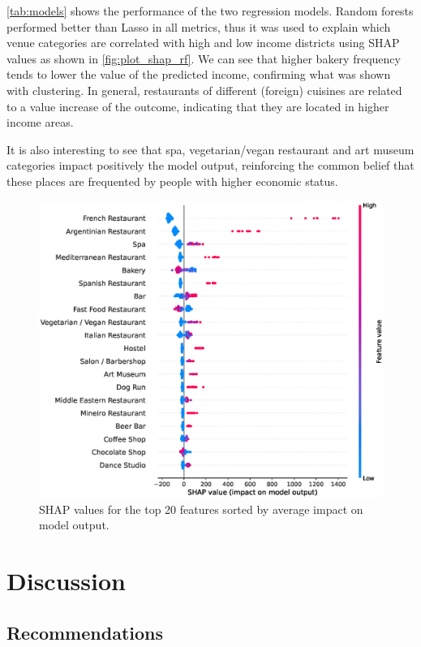 \documentclass[12pt]{article}
\begin{document}
\autoref{tab:models} shows the performance of the two regression models. Random
forests performed better than Lasso in all metrics, thus it was used to explain
which venue categories are correlated with high and low income districts using
SHAP values as shown in \autoref{fig:plot_shap_rf}. We can see that higher
bakery frequency tends to lower the value of the predicted income, confirming
what was shown with clustering. In general, restaurants of different (foreign)
cuisines are related to a value increase of the outcome, indicating that
they are located in higher income areas.

It is also interesting to see that spa, vegetarian/vegan restaurant and art
museum categories impact positively the model output, reinforcing the common
belief that these places are frequented by people with higher economic status.

\begin{figure}[h]
        \centering
        \includegraphics[width=\linewidth]{plot_rf_shap.eps}
        \caption{SHAP values for the top 20 features sorted by average impact
        on model output.\label{fig:plot_shap_rf}}
\end{figure}



\section{Discussion}

\subsection{Recommendations}
\end{document}
